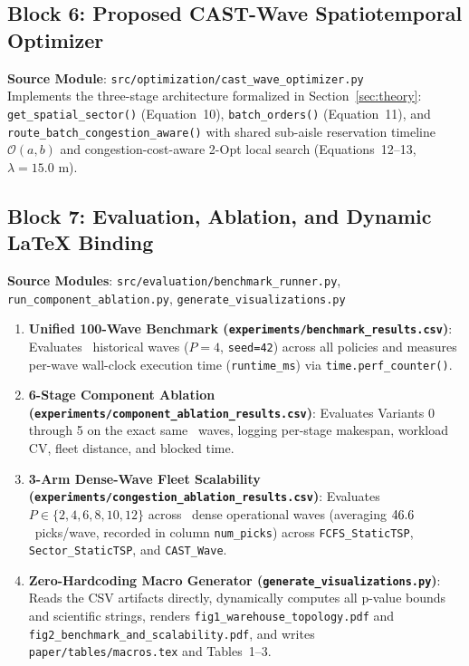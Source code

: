 \documentclass[11pt,a4paper]{article}
\begin{document}
\subsection{Block 6: Proposed CAST-Wave Spatiotemporal Optimizer}
\noindent\textbf{Source Module}: \texttt{src/optimization/cast\_wave\_optimizer.py}\\[0.5em]

Implements the three-stage architecture formalized in Section~\ref{sec:theory}: \texttt{get\_spatial\_sector()} (Equation~10), \texttt{batch\_orders()} (Equation~11), and \texttt{route\_batch\_congestion\_aware()} with shared sub-aisle reservation timeline $\mathcal{O}(a, b)$ and congestion-cost-aware 2-Opt local search (Equations~12--13, $\lambda = 15.0\text{ m}$).

\subsection{Block 7: Evaluation, Ablation, and Dynamic LaTeX Binding}
\noindent\textbf{Source Modules}: \texttt{src/evaluation/benchmark\_runner.py}, \texttt{run\_component\_ablation.py}, \texttt{generate\_visualizations.py}\\[0.5em]

\begin{enumerate}[leftmargin=*]
    \item \textbf{Unified 100-Wave Benchmark (\texttt{experiments/benchmark\_results.csv})}: Evaluates \BenchmarkWaves~historical waves ($P=4$, \texttt{seed=42}) across all policies and measures per-wave wall-clock execution time (\texttt{runtime\_ms}) via \texttt{time.perf\_counter()}.
    \item \textbf{6-Stage Component Ablation (\texttt{experiments/component\_ablation\_results.csv})}: Evaluates Variants 0 through 5 on the exact same \BenchmarkWaves~waves, logging per-stage makespan, workload CV, fleet distance, and blocked time.
    \item \textbf{3-Arm Dense-Wave Fleet Scalability (\texttt{experiments/congestion\_ablation\_results.csv})}: Evaluates $P \in \{2, 4, 6, 8, 10, 12\}$ across \DenseWavesCount~dense operational waves (averaging $46.6$~picks/wave, recorded in column \texttt{num\_picks}) across \texttt{FCFS\_StaticTSP}, \texttt{Sector\_StaticTSP}, and \texttt{CAST\_Wave}.
    \item \textbf{Zero-Hardcoding Macro Generator (\texttt{generate\_visualizations.py})}: Reads the CSV artifacts directly, dynamically computes all p-value bounds and scientific strings, renders \texttt{fig1\_warehouse\_topology.pdf} and \texttt{fig2\_benchmark\_and\_scalability.pdf}, and writes \texttt{paper/tables/macros.tex} and Tables~1--3.
\end{enumerate}
\end{document}
